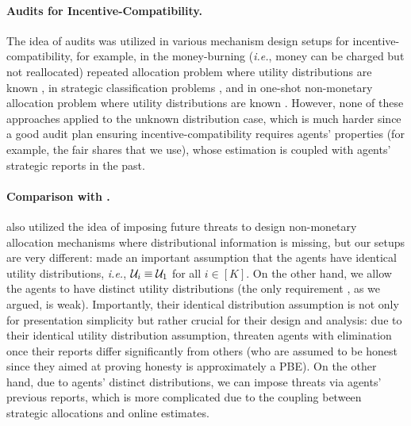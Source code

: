 \paragraph{Audits for Incentive-Compatibility.}
The idea of audits was utilized in various mechanism design setups for incentive-compatibility, for example, in the money-burning (\textit{i.e.}, money can be charged but not reallocated) repeated allocation problem where utility distributions are known \citep{lundy2019allocation}, in strategic classification problems \citep{estornell2021incentivizing,estornell2023incentivizing}, and in one-shot non-monetary allocation problem where utility distributions are known \citep{jalota2024catch}. However, none of these approaches applied to the unknown distribution case, which is much harder since a good audit plan ensuring incentive-compatibility requires agents' properties (for example, the fair shares that we use), whose estimation is coupled with agents' strategic reports in the past.

\paragraph{Comparison with \citep{yin2022online}.}
\citet{yin2022online} also utilized the idea of imposing future threats to design non-monetary allocation mechanisms where distributional information is missing, but our setups are very different:
\citet{yin2022online} made an important assumption that the agents have identical utility distributions, \textit{i.e.}, $\mathcal{U}_i\equiv \mathcal{U}_1$ for all $i\in [K]$. On the other hand, we allow the agents to have distinct utility distributions (the only requirement , as we argued, is weak). 
Importantly, their identical distribution assumption is not only for presentation simplicity but rather crucial for their design and analysis: due to their identical utility distribution assumption, \citet{yin2022online} threaten agents with elimination once their reports differ significantly from others (who are assumed to be honest since they aimed at proving honesty is approximately a PBE). On the other hand, due to agents' distinct distributions, we can impose threats via agents' previous reports, which is more complicated due to the coupling between strategic allocations and online estimates.
